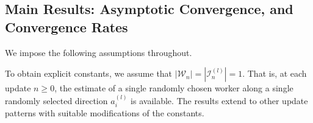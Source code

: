 \documentclass{article}
\newtheorem{remark}[theorem]{Remark}
\DeclareMathOperator*{\sign}{sign}
\newcommand{\rsign}{R-SIGN\xspace}
\newcommand{\cI}{\mathcal{I}}
\newcommand{\cW}{\mathcal{W}}
\begin{document}



\subsection{Main Results: Asymptotic Convergence, and Convergence Rates}
%
We impose the following assumptions throughout.

To obtain explicit constants, we assume that $|\cW_n| = |\cI_n^{(l)}| = 1$. That is, at each update $n \geq 0$, the estimate of a single randomly chosen worker along a single randomly selected direction $a_i^{(l)}$ is available. The results extend to other update patterns with suitable modifications of the constants.
\end{document}
